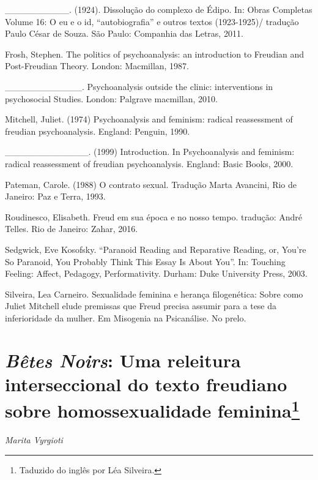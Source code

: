 \_\_\_\_\_\_\_\_\_\_. (1924). Dissolução do complexo de Édipo. In: Obras
Completas Volume 16: O eu e o id, ``autobiografia'' e outros textos
(1923-1925)/ tradução Paulo César de Souza. São Paulo: Companhia das
Letras, 2011.

Frosh, Stephen. The politics of psychoanalysis: an introduction to
Freudian and Post-Freudian Theory. London: Macmillan, 1987.

\_\_\_\_\_\_\_\_\_\_\_\_. Psychoanalysis outside the clinic:
interventions in psychosocial Studies. London: Palgrave macmillan, 2010.

Mitchell, Juliet. (1974) Psychoanalysis and feminism: radical
reassessment of freudian psychoanalysis. England: Penguin, 1990.

\_\_\_\_\_\_\_\_\_\_\_\_\_. (1999) Introduction. In Psychoanalysis and
feminism: radical reassessment of freudian psychoanalysis. England:
Basic Books, 2000.

Pateman, Carole. (1988) O contrato sexual. Tradução Marta Avancini, Rio
de Janeiro: Paz e Terra, 1993.

Roudinesco, Elisabeth. Freud em sua época e no nosso tempo. tradução:
André Telles. Rio de Janeiro: Zahar, 2016.

Sedgwick, Eve Kosofsky. ``Paranoid Reading and Reparative Reading, or,
You're So Paranoid, You Probably Think This Essay Is About You''. In:
Touching Feeling: Affect, Pedagogy, Performativity. Durham: Duke
University Press, 2003.

Silveira, Lea Carneiro. Sexualidade feminina e herança filogenética:
Sobre como Juliet Mitchell elude premissas que Freud precisa assumir
para a tese da inferioridade da mulher. Em Misogenia na Psicanálise. No
prelo.

\chapter*{\emph{Bêtes Noirs}: Uma releitura interseccional do texto freudiano
sobre homossexualidade feminina\footnote{Taduzido do inglês por Léa
  Silveira.}}


\begin{flushright}
\emph{Marita Vyrgioti}
\end{flushright}

